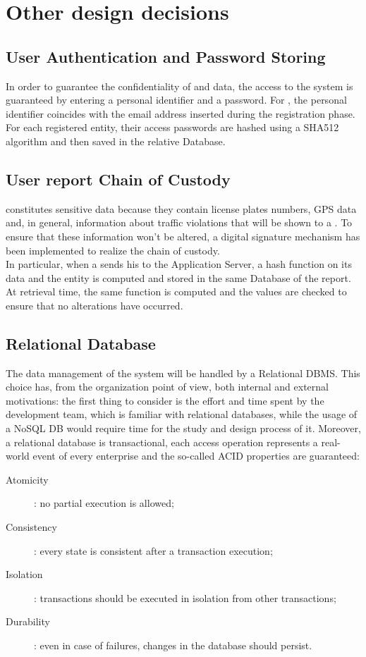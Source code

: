 \documentclass[../../DD.tex]{subfiles}
\begin{document}
\section{Other design decisions\label{sect:2.7}}

\subsection{User Authentication and Password Storing\label{2.7.1}}
In order to guarantee the confidentiality of  and  data, the access to the system is guaranteed by entering a personal identifier and a password. For , the personal identifier coincides with the email address inserted during the registration phase. \\

For each registered entity, their access passwords are hashed using a SHA512 algorithm and then saved in the relative Database.

\subsection{User report Chain of Custody\label{2.7.2}}
 constitutes sensitive data because they contain license plates numbers, GPS data and, in general, information about traffic violations that will be shown to a . To ensure that these information won't be altered, a digital signature mechanism has been implemented to realize the chain of custody. \\

In particular, when a  sends his  to the Application Server, a hash function on its data and the  entity is computed and stored in the same Database of the report. At retrieval time, the same function is computed and the values are checked to ensure that no alterations have occurred.

\subsection{Relational Database\label{2.7.3}}
The data management of the system will be handled by a Relational DBMS. This choice has, from the organization point of view, both internal and external motivations: the first thing to consider is the effort and time spent by the development team, which is familiar with relational databases, while the usage of a NoSQL DB would require time for the study and design process of it.
Moreover, a relational database is transactional, each access operation represents a real-world event of every enterprise and the so-called ACID properties are guaranteed:

	\begin{description}
	\item[Atomicity]: no partial execution is allowed;
	\item[Consistency]: every state is consistent after a transaction execution;
	\item[Isolation]: transactions should be executed in isolation from other transactions;
	\item[Durability]: even in case of failures, changes in the database should persist.
	\end{description}
\end{document}

